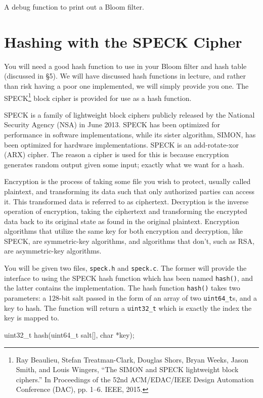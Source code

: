 \documentclass{article}
\begin{document}
A debug function to print out a Bloom filter.

\section{Hashing with the SPECK Cipher}

You will need a good hash function to use in your Bloom filter and hash
table (discussed in \S 5). We will have discussed hash functions in
lecture, and rather than risk having a poor one implemented, we will
simply provide you one. The SPECK\footnote{ Ray Beaulieu, Stefan
  Treatman-Clark, Douglas Shors, Bryan Weeks, Jason Smith, and Louis
Wingers, ``The {SIMON} and {SPECK} lightweight block ciphers.'' In
Proceedings of the 52nd ACM/EDAC/IEEE Design Automation Conference
(DAC), pp.  1--6. IEEE, 2015.} block cipher is provided for use as a
hash function.

SPECK is a family of lightweight block ciphers publicly released by the
National Security Agency (NSA) in June 2013.  SPECK has been optimized
for performance in software implementations, while its sister algorithm,
SIMON, has been optimized for hardware implementations. SPECK is an
add-rotate-xor (ARX) cipher. The reason a cipher is used for this is
because encryption generates random output given some input; exactly
what we want for a hash.

Encryption is the process of taking some file you wish to protect,
usually called plaintext, and transforming its data such that only
authorized parties can access it. This transformed data is referred to
as ciphertext. Decryption is the inverse operation of encryption, taking
the ciphertext and transforming the encrypted data back to its original
state as found in the original plaintext. Encryption algorithms that
utilize the same key for both encryption and decryption, like SPECK, are
symmetric-key algorithms, and algorithms that don't, such as RSA, are
asymmetric-key algorithms.

You will be given two files, \texttt{speck.h} and \texttt{speck.c}. The
former will provide the interface to using the SPECK hash function which
has been named \texttt{hash()}, and the latter contains the
implementation. The hash function \texttt{hash()} takes two parameters:
a 128-bit salt passed in the form of an array of two
\texttt{uint64\_t}s, and a key to hash. The function will return a
\texttt{uint32\_t} which is exactly the index the key is mapped to.

\begin{codelisting}{}
uint32_t hash(uint64_t salt[], char *key);
\end{codelisting}{}
\end{document}
